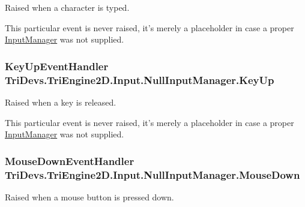 Raised when a character is typed. 

This particular event is never raised, it's merely a placeholder in case a proper \hyperlink{class_tri_devs_1_1_tri_engine2_d_1_1_input_1_1_input_manager}{Input\-Manager} was not supplied. \hypertarget{class_tri_devs_1_1_tri_engine2_d_1_1_input_1_1_null_input_manager_a2fe91d029b3f7d69b4a838e8ff6e146d}{
\subsubsection[{Key\-Up}]{\setlength{\rightskip}{0pt plus 5cm}Key\-Up\-Event\-Handler Tri\-Devs.\-Tri\-Engine2\-D.\-Input.\-Null\-Input\-Manager.\-Key\-Up}}\label{class_tri_devs_1_1_tri_engine2_d_1_1_input_1_1_null_input_manager_a2fe91d029b3f7d69b4a838e8ff6e146d}


Raised when a key is released. 

This particular event is never raised, it's merely a placeholder in case a proper \hyperlink{class_tri_devs_1_1_tri_engine2_d_1_1_input_1_1_input_manager}{Input\-Manager} was not supplied. \hypertarget{class_tri_devs_1_1_tri_engine2_d_1_1_input_1_1_null_input_manager_a36568290aba8d4dbc893792eb01ea032}{
\subsubsection[{Mouse\-Down}]{\setlength{\rightskip}{0pt plus 5cm}Mouse\-Down\-Event\-Handler Tri\-Devs.\-Tri\-Engine2\-D.\-Input.\-Null\-Input\-Manager.\-Mouse\-Down}}\label{class_tri_devs_1_1_tri_engine2_d_1_1_input_1_1_null_input_manager_a36568290aba8d4dbc893792eb01ea032}


Raised when a mouse button is pressed down. 

